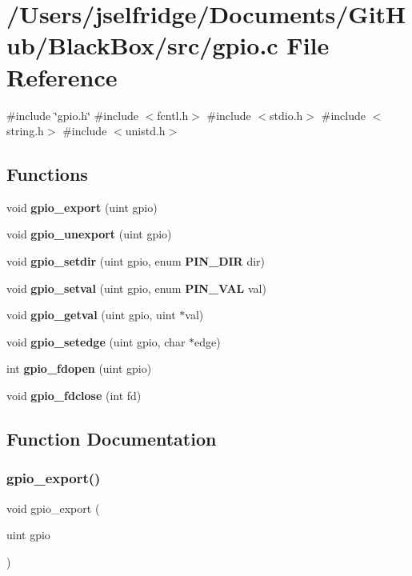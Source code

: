 \section{/\+Users/jselfridge/\+Documents/\+Git\+Hub/\+Black\+Box/src/gpio.c File Reference}
\label{gpio_8c}
{\ttfamily \#include \char`\"{}gpio.\+h\char`\"{}}\newline
{\ttfamily \#include $<$fcntl.\+h$>$}\newline
{\ttfamily \#include $<$stdio.\+h$>$}\newline
{\ttfamily \#include $<$string.\+h$>$}\newline
{\ttfamily \#include $<$unistd.\+h$>$}\newline
\subsection*{Functions}
\begin{DoxyCompactItemize}
\item 
void \textbf{ gpio\+\_\+export} (uint gpio)
\item 
void \textbf{ gpio\+\_\+unexport} (uint gpio)
\item 
void \textbf{ gpio\+\_\+setdir} (uint gpio, enum \textbf{ P\+I\+N\+\_\+\+D\+IR} dir)
\item 
void \textbf{ gpio\+\_\+setval} (uint gpio, enum \textbf{ P\+I\+N\+\_\+\+V\+AL} val)
\item 
void \textbf{ gpio\+\_\+getval} (uint gpio, uint $\ast$val)
\item 
void \textbf{ gpio\+\_\+setedge} (uint gpio, char $\ast$edge)
\item 
int \textbf{ gpio\+\_\+fdopen} (uint gpio)
\item 
void \textbf{ gpio\+\_\+fdclose} (int fd)
\end{DoxyCompactItemize}


\subsection{Function Documentation}
\mbox{\label{gpio_8c_a5dbb5086ddc8eaadfb743bcfaa0da2c3}} 
\subsubsection{gpio\+\_\+export()}
{\footnotesize\ttfamily void gpio\+\_\+export (\begin{DoxyParamCaption}\item[{uint}]{gpio }\end{DoxyParamCaption})}

